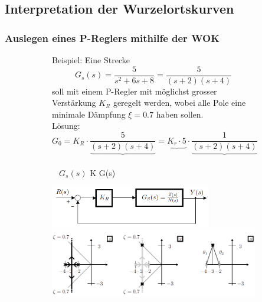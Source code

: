 \subsection{Interpretation der Wurzelortskurven}

\subsubsection{Auslegen eines P-Reglers mithilfe der WOK}
\begin{figure}[h!]
	\begin{subfigure}[b]{8.5cm}
Beispiel: Eine Strecke \[G_s(s)=\frac{5}{s^2 + 6s +8}=\frac{5}{(s+2)(s+4)}\] soll mit einem P-Regler mit
 möglichst grosser Verstärkung $K_R$ geregelt werden, wobei alle Pole eine minimale
 Dämpfung $\xi = 0.7$ haben sollen.\\
Lösung: \[G_0=K_R\cdot\frac{5}{\underbrace{(s+2)(s+4)}}=\underbrace{K_r\cdot 5} \cdot\frac{1}{\underbrace{(s+2)(s+4)}}\]
\vspace{-0.5cm}\\
\textcolor{white}{x} \hspace{1.75cm} $G_s(s)$ \hspace{1.45cm} K  \hspace{1.1cm} G(s)\\

	\end{subfigure}\qquad
	\begin{subfigure}[b]{10cm}
		\includegraphics[width=7cm]{./images/PReglerBeispielWOK1.png}
		\includegraphics[width=10cm]{./images/PReglerBeispielWOK2.png}
	\end{subfigure}
\end{figure}

